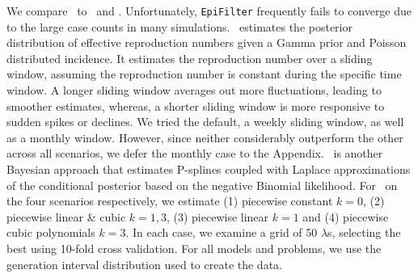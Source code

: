 We compare \RtEstim\ to \EpiEstim\ and \EpiLPS. Unfortunately,
\texttt{EpiFilter} frequently fails to converge due to the large case counts in
many simulations. \EpiEstim\ estimates the posterior distribution of effective
reproduction numbers given a Gamma prior and Poisson distributed incidence. It
estimates the reproduction number over a sliding window, assuming the
reproduction number is constant during the specific time window. A longer
sliding window averages out more fluctuations, leading to smoother estimates,
whereas, a shorter sliding window is more responsive to sudden spikes or
declines. We tried the default, a weekly sliding window, as well as a monthly
window. However, since neither considerably outperform the other across all
scenarios, we defer the monthly case to the Appendix. \EpiLPS\ is another
Bayesian approach that estimates P-splines coupled with Laplace approximations
of the conditional posterior based on the negative Binomial likelihood. For
\RtEstim\ on the four scenarios respectively, we estimate (1) piecewise constant
$k=0$, (2) piecewise linear \& cubic $k=1,3$, (3) piecewise linear $k=1$ and (4)
piecewise cubic polynomials $k=3$. In each case, we examine a grid of 50
$\lambda$s, selecting the best using 10-fold cross validation. For all models and
problems, we use the generation interval distribution used to create the data. 

